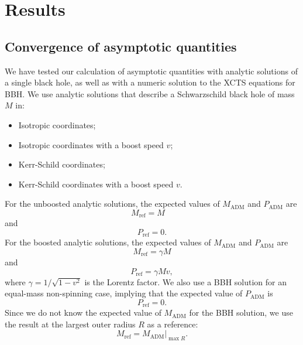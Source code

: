 \documentclass{../document}
\begin{document}
  \section{Results}

    \subsection{Convergence of asymptotic quantities}

      We have tested our calculation of asymptotic quantities with analytic solutions of a single black hole, as well as with a numeric solution to the XCTS equations for BBH. We use analytic solutions that describe a Schwarzschild black hole of mass $M$ in:
      \begin{itemize}
        \item Isotropic coordinates;
        \item Isotropic coordinates with a boost speed $v$;
        \item Kerr-Schild coordinates;
        \item Kerr-Schild coordinates with a boost speed $v$.
      \end{itemize}
      For the unboosted analytic solutions, the expected values of $M_\text{ADM}$ and $P_\text{ADM}$ are
      \begin{equation}
        M_\text{ref} = M \quad
      \end{equation}
      and
      \begin{equation}
        P_\text{ref} = 0.
      \end{equation}
      For the boosted analytic solutions, the expected values of $M_\text{ADM}$ and $P_\text{ADM}$ are
      \begin{equation}
        M_\text{ref} = \gamma M
      \end{equation}
      and
      \begin{equation}
        P_\text{ref} = \gamma M v,
      \end{equation}
      where $\gamma = 1 / \sqrt{1 - v^2}$ is the Lorentz factor. We also use a BBH solution for an equal-mass non-spinning case, implying that the expected value of $P_\text{ADM}$ is
      \begin{equation}
        P_\text{ref} = 0.
      \end{equation}
      Since we do not know the expected value of $M_\text{ADM}$ for the BBH solution, we use the result at the largest outer radius $R$ as a reference:
      \begin{equation}
        M_\text{ref} = M_\text{ADM} |_{\max R}.
      \end{equation}
\end{document}

